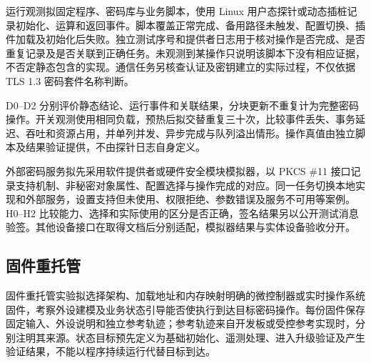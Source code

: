 \label{subsec:runtime-crypto-experiment}
运行观测拟固定程序、密码库与业务脚本，使用 Linux 用户态探针或动态插桩记录初始化、运算和返回事件\cite{linux-uprobes}。脚本覆盖正常完成、备用路径未触发、配置切换、插件加载及初始化后失败。独立测试序号和提供者日志用于核对操作是否完成、是否重复记录及是否关联到正确任务。未观测到某操作只说明该脚本下没有相应证据，不否定静态包含的实现。通信任务另核查认证及密钥建立的实际过程，不仅依据 TLS 1.3 密码套件名称判断\cite{rfc8446}。

D0--D2 分别评价静态结论、运行事件和关联结果，分块更新不重复计为完整密码操作。开关观测使用相同负载，预热后拟交替重复三十次，比较事件丢失、事务延迟、吞吐和资源占用，并单列并发、异步完成与队列溢出情形。操作真值由独立脚本及结果验证提供，不由探针日志自身定义。

\label{subsec:hardware-provider-experiment}
外部密码服务拟先采用软件提供者或硬件安全模块模拟器，以 PKCS \#11 接口记录支持机制、非秘密对象属性、配置选择与操作完成的对应\cite{pkcs11-v31}。同一任务切换本地实现和外部服务，设置支持但未使用、权限拒绝、参数错误及服务不可用等案例。H0--H2 比较能力、选择和实际使用的区分是否正确，签名结果另以公开测试消息验签。其他设备接口在取得文档后分别适配，模拟器结果与实体设备验收分开。


\subsection{固件重托管}
\label{subsec:firmware-rehosting-experiment}

固件重托管实验拟选择架构、加载地址和内存映射明确的微控制器或实时操作系统固件，考察外设建模及业务状态引导能否使执行到达目标密码操作。每份固件保存固定输入、外设说明和独立参考轨迹；参考轨迹来自开发板或受控参考实现时，分别注明其来源。状态目标预先定义为基础初始化、遥测处理、进入升级验证及产生验证结果，不能以程序持续运行代替目标到达。

